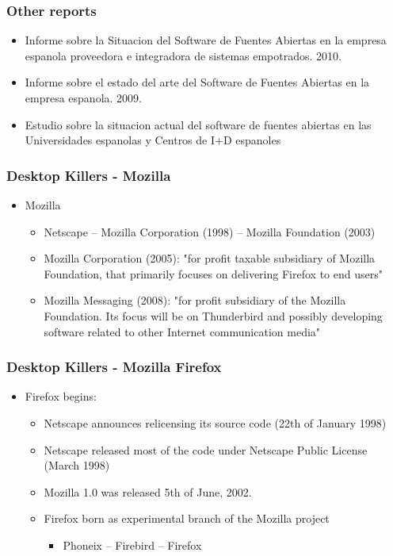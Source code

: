 \documentclass{beamer}
\begin{document}
\begin{frame}
\frametitle{Other reports}

\begin{itemize}
\item Informe sobre la Situacion del Software de Fuentes Abiertas en la empresa espanola proveedora e integradora de sistemas empotrados. 2010.
\item Informe sobre el estado del arte del Software de Fuentes Abiertas en la empresa espanola. 2009. 
\item Estudio sobre la situacion actual del software de fuentes abiertas en las Universidades espanolas y Centros de I+D espanoles 

\end{itemize}

\end{frame}





\begin{frame}
\frametitle{Desktop Killers - Mozilla}

\begin{itemize}
\item Mozilla
	\begin{itemize}
	\item Netscape --  Mozilla Corporation (1998) -- Mozilla Foundation (2003)
	\item Mozilla Corporation (2005): "for profit taxable subsidiary of Mozilla Foundation, that primarily focuses on delivering Firefox to end users"
	\item Mozilla Messaging (2008): "for profit subsidiary of the Mozilla Foundation. Its focus will be on Thunderbird and possibly developing software related to other Internet communication media"
	\end{itemize}

\end{itemize}
\end{frame}


\begin{frame}
\frametitle{Desktop Killers - Mozilla Firefox}

\begin{itemize}
\item Firefox begins:
	\begin{itemize}
	\item Netscape announces relicensing its source code (22th of January 1998)
	\item Netscape released most of the code under Netscape Public License (March 1998)
	\item Mozilla 1.0 was released 5th of June, 2002.
	\item Firefox born as experimental branch of the Mozilla project
		\begin {itemize}
		\item Phoneix -- Firebird -- Firefox
		\end {itemize}
	\end{itemize}
\end{itemize}

\end{frame}
\end{document}
